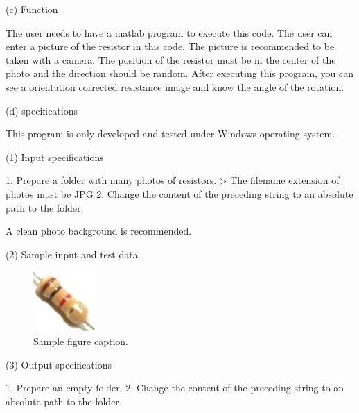 \documentclass{article}
\begin{document}
(c) Function

The user needs to have a matlab program to execute this code.
The user can enter a picture of the resistor in this code. The picture is recommended to be taken with a camera. The position of the resistor must be in the center of the photo and the direction should be random.
After executing this program, you can see a orientation corrected resistance image and know the angle of the rotation.

(d) specifications

This program is only developed and tested under Windows operating system.

(1) Input specifications


1. Prepare a folder with many photos of resistors.
> The filename extension of photos must be JPG
2. Change the content of the preceding string to an absolute path to the folder.

A clean photo background is recommended.

(2) Sample input and test data

\begin{figure}
	\centering
	\includegraphics[width=0.7\linewidth]{e5hIvV0.jpg}
	\caption{Sample figure caption.}
	\label{fig:e5hIvV0jpg}
\end{figure}

(3) Output specifications


1. Prepare an empty folder.
2. Change the content of the preceding string to an absolute path to the folder.
\end{document}
